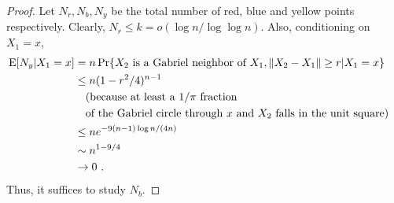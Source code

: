 \documentclass[10pt]{llncs}
\newcommand{\PROB}{\Pr}
\newcommand{\EXP}{\mathrm{E}}
\begin{document}
\begin{proof}
%

%

Let $N_r , N_b, N_y$ be the total number of red, blue and yellow
points respectively.
Clearly, $N_r \le k = o(\log n /\log \log n)$.
Also, conditioning on $X_1 = x$,
\[
\begin{aligned}
\EXP [N_y | X_1 = x] 
&= n \PROB \{ X_2 ~\hbox{\rm is a Gabriel neighbor of}~ X_1 , \| X_2 - X_1 \| \ge r | X_1 = x \} \cr
&\le n (1-r^2/4)^{n-1} \cr
&\quad \hbox{\rm (because at least a $1/\pi$ fraction} \cr
&\quad \hbox{\rm of the Gabriel circle through $x$ and $X_2$ falls in the unit square)} \cr
&\le n e^{-9(n-1) \log n / (4 n)} \cr
&\sim n^{1-9/4} \cr
&\to 0~. \cr
\end{aligned}
\]
Thus, it suffices to study $N_b$.


\end{proof}
\end{document}
